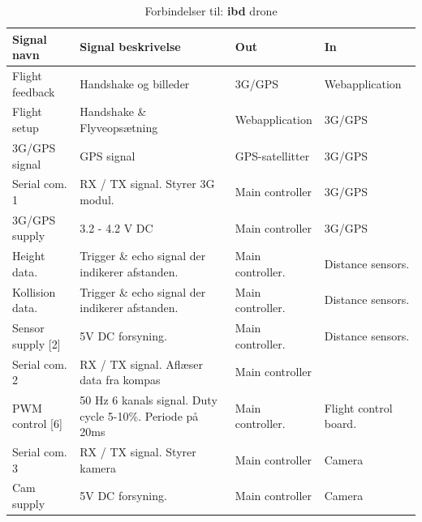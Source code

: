 \begin{table}[H]
	\centering
		\begin{tabular}{|p{2.6 cm}|p{4.9 cm}|p{2.5 cm}|p{2.5 cm}|}  
		\hline
			\textbf{Signal navn} 	& \textbf{Signal beskrivelse}		& \textbf{Out} 		& \textbf{In}     \\ \hline
			Flight feedback		& Handshake og billeder				& 3G/GPS			& Webapplication	\\ \hline
			Flight setup		& Handshake \& Flyveopsætning  		& Webapplication			& 3G/GPS	\\ \hline
			3G/GPS signal 		& GPS signal	& GPS-satellitter				& 3G/GPS	\\ \hline			
			
			Serial com. 1		& RX / TX signal. Styrer 3G modul. 	& Main controller 	& 3G/GPS    \\ \hline
			3G/GPS supply 		& 3.2 - 4.2 V DC						& Main controller	& 3G/GPS	\\ \hline
			Height data.		& Trigger \& echo signal der indikerer afstanden. 	& Main controller.	& Distance sensors.	\\ \hline
			Kollision data.		& Trigger \& echo signal der indikerer afstanden. 	& Main controller.	& Distance sensors.  \\ \hline
			Sensor supply [2]	& 5V DC forsyning.	& Main controller. & Distance sensors.	\\ \hline
			Serial com. 2		& RX / TX signal. Aflæser data fra kompas & Main controller				& 	\\ \hline 
			PWM control [6]		& 50 Hz 6 kanals signal. Duty cycle 5-10\%. Periode på 20ms	& Main controller.				& Flight control board.	\\ \hline
			Serial com. 3		& RX / TX signal. Styrer kamera	& Main controller	& Camera	\\ \hline
			Cam supply			& 5V DC forsyning. 	& Main controller	& Camera	\\ \hline 
		\end{tabular}
	\caption{Forbindelser til: \textbf{ibd} drone}
	\label{tab:ibddrone}
\end{table}

